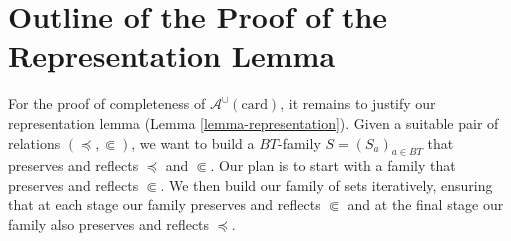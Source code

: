 \documentclass[letterpaper]{article} %
\theoremstyle{definition}
\newcommand{\Aunion}{\mathscr{A}^{\cup}}
\newcommand{\card}{\mathrm{card}}
\newcommand{\precsubseteq}{\Subset}
\newcommand{\suitable}{suitable}%
\begin{document}
\section{Outline of the Proof of the Representation Lemma}\label{s:representation}

For the proof of completeness of $\Aunion(\card)$, it remains to justify our representation lemma (Lemma \ref{lemma-representation}).  Given a \suitable{} pair of relations $(\preceq, \precsubseteq)$, we want to build a $BT$-family $S = (S_a)_{a\in BT}$ that preserves and reflects $\preceq$ and $\precsubseteq$.  Our plan is to start with a family that preserves and reflects $\precsubseteq$.  We then build our family of sets iteratively, ensuring that at each stage our family preserves and reflects $\precsubseteq$ and at the final stage our family also preserves and reflects $\preceq$.
\end{document}
